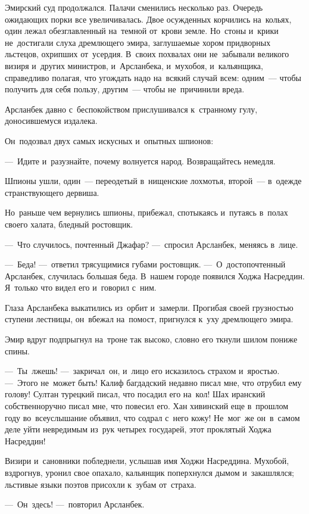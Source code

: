\documentclass[12pt,a4paper]{book}
\begin{document}
Эмирский суд продолжался. Палачи сменились несколько раз. Очередь ожидающих порки все увеличивалась. Двое осужденных корчились на~кольях, один лежал обезглавленный на~темной от~крови земле. Но~стоны и~крики не~достигали слуха дремлющего эмира, заглушаемые хором придворных льстецов, охрипших от~усердия. В~своих похвалах они не~забывали великого визиря и~других министров, и~Арсланбека, и~мухобоя, и~кальянщика, справедливо полагая, что угождать надо на~всякий случай всем: одним~— чтобы получить для себя пользу, другим~— чтобы не~причинили вреда.

Арсланбек давно с~беспокойством прислушивался к~странному гулу, доносившемуся издалека.

Он~подозвал двух самых искусных и~опытных шпионов:

—~Идите и~разузнайте, почему волнуется народ. Возвращайтесь немедля.

Шпионы ушли, один~— переодетый в~нищенские лохмотья, второй~— в~одежде странствующего дервиша.

Но~раньше чем вернулись шпионы, прибежал, спотыкаясь и~путаясь в~полах своего халата, бледный ростовщик.

—~Что случилось, почтенный Джафар? —~спросил Арсланбек, меняясь в~лице.

—~Беда! —~ответил трясущимися губами ростовщик. —~О~достопочтенный Арсланбек, случилась большая беда. В~нашем городе появился Ходжа Насреддин. Я~только что видел его и~говорил с~ним.

Глаза Арсланбека выкатились из~орбит и~замерли. Прогибая своей грузностью ступени лестницы, он~вбежал на~помост, пригнулся к~уху дремлющего эмира.

Эмир вдруг подпрыгнул на~троне так высоко, словно его ткнули шилом пониже спины.

—~Ты~лжешь! —~закричал~он, и~лицо его исказилось страхом и~яростью. —~Этого не~может быть! Калиф багдадский недавно писал мне, что отрубил ему голову! Султан турецкий писал, что посадил его на~кол! Шах иранский собственноручно писал мне, что повесил его. Хан хивинский еще в~прошлом году во~всеуслышание объявил, что содрал с~него кожу! Не~мог~же он~в~самом деле уйти невредимым из~рук четырех государей, этот проклятый Ходжа Насреддин!

Визири и~сановники побледнели, услышав имя Ходжи Насреддина. Мухобой, вздрогнув, уронил свое опахало, кальянщик поперхнулся дымом и~закашлялся; льстивые языки поэтов присохли к~зубам от~страха.

—~Он~здесь! —~повторил Арсланбек.
\end{document}
